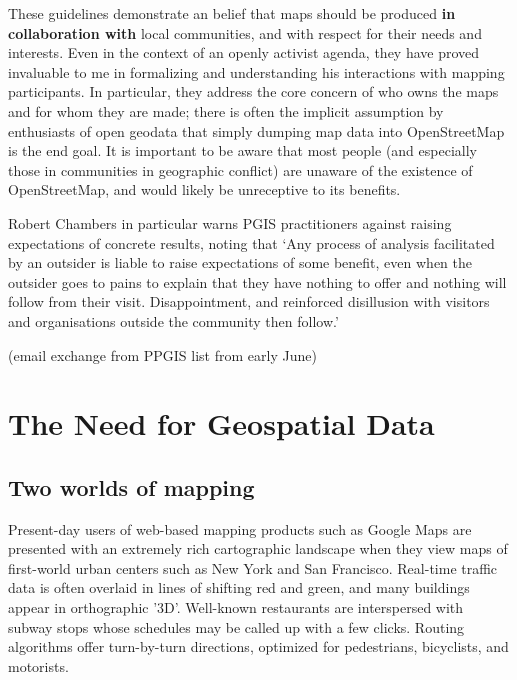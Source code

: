\documentclass[11pt,oneside,notitlepage]{report}
\begin{document}
These guidelines demonstrate an belief that maps should be produced \textbf{in collaboration with} local communities, and with respect for their needs and interests. Even in the context of an openly activist agenda, they have proved invaluable to me in formalizing and understanding his interactions with mapping participants. In particular, they address the core concern of who owns the maps and for whom they are made; there is often the implicit assumption by enthusiasts of open geodata that simply dumping map data into OpenStreetMap is the end goal. It is important to be aware that most people (and especially those in communities in geographic conflict) are unaware of the existence of OpenStreetMap, and would likely be unreceptive to its benefits. 

Robert Chambers in particular warns PGIS practitioners against raising expectations of concrete results, noting that `Any process of analysis facilitated by an outsider is liable to raise expectations of some benefit, even when the outsider goes to pains to explain that they have nothing to offer and nothing will follow from their visit. Disappointment, and reinforced disillusion with visitors and organisations outside the community then follow.' \cite{chambers2006whose}

(email exchange from PPGIS list from early June) 

\chapter{The Need for Geospatial Data}
\label{chap:need}
\section{Two worlds of mapping}
\label{sec:twoworlds}

Present-day users of web-based mapping products such as Google Maps are presented with an extremely rich cartographic landscape when they view maps of first-world urban centers such as New York and San Francisco. Real-time traffic data is often overlaid in lines of shifting red and green, and many buildings appear in orthographic '3D'. Well-known restaurants are interspersed with subway stops whose schedules may be called up with a few clicks. Routing algorithms offer turn-by-turn directions, optimized for pedestrians, bicyclists, and motorists. 
\end{document}
